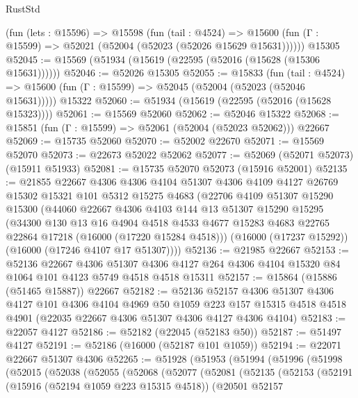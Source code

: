 \begin{lexlean}{RustStd}
\begin{coremodule}
    (fun (lets : @15596) =>
    @15598
      (fun (tail : @4524) =>
      @15600 (fun (Γ : @15599) => @52021 (@52004 (@52023 (@52026 @15629 @15631))))))
    @15305
@52045 := @15569 (@51934 (@15619 (@22595 (@52016 (@15628 (@15306 @15631))))))
@52046 := @52026 @15305
@52055 := @15833
    (fun (tail : @4524) => @15600 (fun (Γ : @15599) => @52045 (@52004 (@52023 (@52046 @15631)))))
    @15322
@52060 := @51934 (@15619 (@22595 (@52016 (@15628 @15323))))
@52061 := @15569 @52060
@52062 := @52046 @15322
@52068 := @15851 (fun (Γ : @15599) => @52061 (@52004 (@52023 @52062))) @22667
@52069 := @15735 @52060
@52070 := @52002 @22670
@52071 := @15569 @52070
@52073 := @22673 @52022 @52062
@52077 := @52069 (@52071 @52073) (@15911 @51933)
@52081 := @15735 @52070 @52073 (@15916 @52001)
@52135 := @21855
    @22667
    @4306
    @4306
    @4104
    @51307
    @4306
    @4109
    @4127
    @26769
    @15302
    @15321
    @101
    @5312
    @15275
    @4683
    (@22706
      @4109
      @51307
      @15290
      @15300
      (@44060
        @22667
        @4306
        @4103
        @144
        @13
        @51307
        @15290
        @15295
        (@34300
          @130
          @13
          @16
          @4904
          @4518
          @4533
          @4677
          @15283
          @4683
          @22765
          @22864
          @17218
          (@16000 (@17220 @15284 @4518)))
        (@16000 (@17237 @15292))
        (@16000 (@17246 @4107 @17 @51307))))
@52136 := @21985 @22667
@52153 := @52136
    @22667
    @4306
    @51307
    @4306
    @4127
    @264
    @4306
    @4104
    @15320
    @84
    @1064
    @101
    @4123
    @5749
    @4518
    @4518
    @15311
@52157 := @15864 (@15886 (@51465 @15887)) @22667
@52182 := @52136
    @52157
    @4306
    @51307
    @4306
    @4127
    @101
    @4306
    @4104
    @4969
    @50
    @1059
    @223
    @157
    @15315
    @4518
    @4518
    @4901
    (@22035 @22667 @4306 @51307 @4306 @4127 @4306 @4104)
@52183 := @22057 @4127
@52186 := @52182 (@22045 (@52183 @50))
@52187 := @51497 @4127
@52191 := @52186 (@16000 (@52187 @101 @1059))
@52194 := @22071 @22667 @51307 @4306
@52265 := @51928
    (@51953
      (@51994
        (@51996
          (@51998
            (@52015
              (@52038
                (@52055
                  (@52068
                    (@52077
                      (@52081
                        (@52135
                          (@52153
                            (@52191
                              (@15916 (@52194 @1059 @223 @15315 @4518))
                              (@20501
                                @52157

\end{coremodule}
\end{lexlean}
